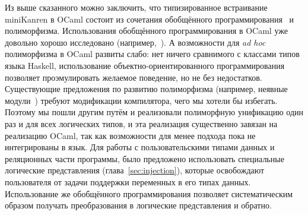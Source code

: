 Из выше сказанного можно заключить, что типизированное встраивание miniKanren в OCaml состоит из сочетания обобщённого программирования~\cite{DGP} и \adhoc{}  полиморфизма.
Использования обобщённого программирования в OCaml уже довольно хорошо исследовано (например,~\cite{Deriving}).
А возможности для \emph{ad hoc} полиморфизма в OCaml развиты слабо: нет ничего сравнимого с классами типов языка Haskell, использование объектно-ориентированного программирования позволяет проэмулировать желаемое поведение, но не без недостатков.
Существующие предложения по развитию \adhoc{} полиморфизма (например, неявные модули~\cite{Implicits}) требуют модификации компилятора, чего мы хотели бы избегать.
Поэтому мы пошли другим путём и реализовали полиморфную унификацию один раз и для всех логических типов, и эта реализация существенно завязан на реализацию OCaml,
так как возможности для менее \adhoc{} подхода пока не интегрированы в язык.
Для работы с пользовательскими типами данных и реляционных части программы, было предложено использовать специальные логические представления (глава~\ref{sec:injection}), которые освобождают пользователя от задачи поддержки переменных в его типах данных.
Использование же обобщённого программирования позволяет систематическим образом получать преобразования в логические представления и обратно.

%
%
%
